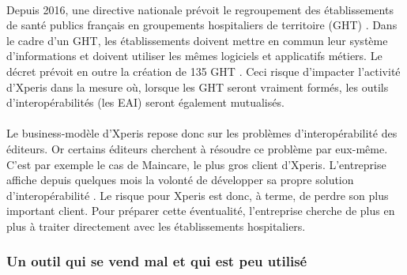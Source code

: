 			\paragraph{}%
			Depuis 2016, une directive nationale prévoit le regroupement des établissements de 
			santé publics français en groupements hospitaliers de territoire (GHT) 
			\citep{valls_decret_2016}. Dans le cadre d'un GHT, les établissements doivent mettre 
			en commun leur système d'informations et doivent utiliser les mêmes logiciels et 
			applicatifs métiers. Le décret prévoit en outre la création de 135 GHT  
			\citep{touraine_marisol_2016}. Ceci risque d'impacter l'activité d'Xperis dans la 
			mesure où, lorsque les GHT seront vraiment formés, les outils d'interopérabilités 
			(les EAI) seront également mutualisés.
			
			\paragraph{}%
			Le business-modèle d'Xperis repose donc sur les problèmes d'interopérabilité des 
			éditeurs. Or certains éditeurs cherchent à résoudre ce problème par eux-même. C'est 
			par exemple le cas de Maincare, le plus gros client d'Xperis. L'entreprise affiche 
			depuis quelques mois la volonté de développer sa propre solution d'interopérabilité 
			\citep{perochon_e-sante:_2016}. Le risque pour Xperis est donc, à terme, de perdre son 
			plus important client. Pour préparer cette éventualité, l'entreprise cherche de plus 
			en plus à traiter directement avec les établissements hospitaliers.
			
			\paragraph{}%
			
		\subsubsection{Un outil qui se vend mal et qui est peu utilisé}
			\paragraph{}%
			
			\paragraph{}%
			
